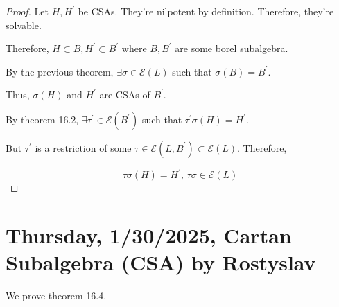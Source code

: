 \documentclass{article}
\theoremstyle{definition}
\begin{document}
    \begin{proof}
        Let \(H,H^{\prime}\) be CSAs. They're nilpotent by definition. Therefore, they're solvable. 

        Therefore, \(H \subset B, H^{\prime} \subset B^{\prime}\) where \(B,B^{\prime}\) are some borel subalgebra.

        By the previous theorem, \(\exists \sigma \in \mathscr{E}(L)\) such that \(\sigma(B) = B^{\prime}\).

        Thus, \(\sigma(H)\) and \(H^{\prime}\) are CSAs of \(B^{\prime}\).

        By theorem 16.2, \(\exists \tau^{\prime} \in \mathscr{E}(B^{\prime})\) such that \(\tau ^{\prime} \sigma (H) = H^{\prime}\).

        But \(\tau ^{\prime} \) is a restriction of some \(\tau \in \mathscr{E}(L,B^{\prime}) \subset \mathscr{E}(L)\). Therefore,

        \[
            \tau \sigma (H) = H^{\prime}, \, \tau \sigma \in \mathscr{E}(L)
        \]

    \end{proof}

    \section{Thursday, 1/30/2025, Cartan Subalgebra (CSA) by Rostyslav}

    \begin{center}
    \end{center}

    We prove theorem 16.4.
\end{document}
